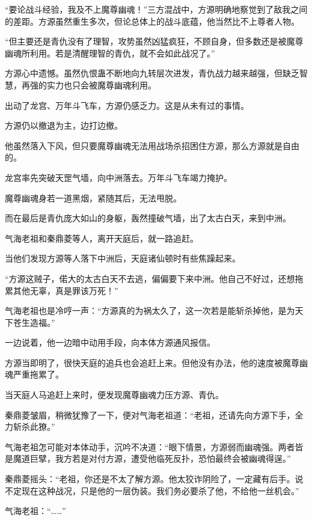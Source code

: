 
\begin{this_body}

“要论战斗经验，我及不上魔尊幽魂！”三方混战中，方源明确地察觉到了敌我之间的差距。方源虽然重生多次，但论总体上的战斗底蕴，他当然比不上尊者人物。

“但主要还是青仇没有了理智，攻势虽然凶猛疯狂，不顾自身，但多数还是被魔尊幽魂所利用。若是清醒理智的青仇，就不会如此战况了。”

方源心中遗憾。虽然仇恨蛊不断地向九转层次进发，青仇战力越来越强，但缺乏智慧，再强的实力也只会被魔尊幽魂利用。

出动了龙宫、万年斗飞车，方源仍感乏力。这是从未有过的事情。

方源仍以撤退为主，边打边撤。

他虽然落入下风，但只要魔尊幽魂无法用战场杀招困住方源，那么方源就是自由的。

龙宫率先突破天罡气墙，向中洲落去。万年斗飞车竭力掩护。

魔尊幽魂身若一道黑烟，紧随其后，无法甩脱。

而在最后是青仇庞大如山的身躯，轰然撞破气墙，出了太古白天，来到中洲。

气海老祖和秦鼎菱等人，离开天庭后，就一路追赶。

当他们发现方源等人落下中洲后，天庭诸仙顿时有些焦躁起来。

“方源这贼子，偌大的太古白天不去逃，偏偏要下来中洲。他自己不好过，还想拖累其他无辜，真是罪该万死！”

气海老祖也是冷哼一声：“方源真的为祸太久了，这一次若是能斩杀掉他，是为天下苍生造福。”

一边说着，他一边暗中动用手段，向本体方源通风报信。

方源当即明了，很快天庭的追兵也会追赶上来。但他没有办法，他的速度被魔尊幽魂严重拖累了。

当天庭人马追赶上来时，便发现魔尊幽魂力压方源、青仇。

秦鼎菱皱眉，稍微犹豫了一下，便对气海老祖道：“老祖，还请先向方源下手，全力斩杀此獠。”

气海老祖怎可能对本体动手，沉吟不决道：“眼下情景，方源弱而幽魂强。两者皆是魔道巨擘，我方若是对付方源，遭受他临死反扑，恐怕最终会被幽魂得逞。”

秦鼎菱摇头：“老祖，你还是不太了解方源。他太狡诈阴险了，一定藏有后手。说不定现在这种战况，只是他的一层伪装。我们务必要杀了他，不给他一丝机会。”

气海老祖：“……”


\end{this_body}

